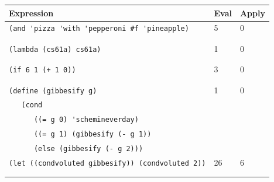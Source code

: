\documentclass{exam}
\begin{document}
\begin{questions}
\begin{solution}
\begin{center}
    \begin{tabular}{|m{12cm}|m{1cm}|m{1cm}|}
\hline
\textbf{Expression} & \textbf{Eval} & \textbf{Apply} \\
\hline
\lstinline$(and 'pizza 'with 'pepperoni #f 'pineapple)$ & {\color{red}5} & {\color{red}0} \\ & & \\ & &  \\
\hline
\lstinline$(lambda (cs61a) cs61a)$ & {\color{red}1} &  {\color{red}0} \\ & & \\ & & \\
\hline
\lstinline$(if 6 1 (+ 1 0))$ & {\color{red}3} & {\color{red}0} \\ & & \\ & & \\
\hline
\lstinline$(define (gibbesify g) $ & {\color{red}1} & {\color{red}0} \\
\lstinline$   (cond  $ & & \\
\lstinline$      ((= g 0) 'schemineverday)$ & & \\
\lstinline$      ((= g 1) (gibbesify (- g 1))$ & & \\
\lstinline$      (else (gibbesify (- g 2)))$ & & \\
\hline
\lstinline$(let ((condvoluted gibbesify)) (condvoluted 2))$ & {\color{red}26} & {\color{red}6}\\ & & \\ & & \\
\hline
\end{tabular}
\end{center}
\end{solution}
\end{questions}


\end{document}
